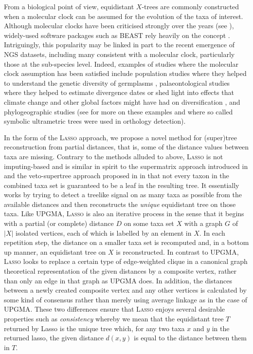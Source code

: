 From a biological point of view, equidistant $X$-trees are commonly
constructed when a molecular clock can be assumed for the evolution of the
taxa of interest.  Although molecular clocks have been criticised strongly
over the years (see \cite{ayala99molecular,schwartz06molecular}), widely-used
software packages such as BEAST rely heavily on the concept
\cite{bouckaert14beast}.  Intriguingly, this popularity may be linked in part
to the recent emergence of NGS datasets, including many consistent with a
molecular clock, particularly those at the sub-species level.  Indeed,
examples of studies where the molecular clock assumption has been satisfied
include population studies where they helped to understand the genetic
diversity of germplasms \cite{xiao10ssr}, palaeontological studies where they
helped to estimate divergence dates or shed light into effects that climate
change and other global factors might have had on diversification
\cite{weir08ice}, and phylogeographic studies \cite{confal1998mitochon} (see
\cite{weir08calibrating} for more on these examples and
\cite{hellmuth13orthology} where so called symbolic ultrametric trees were
used in orthology detection).

In the form of the \textsc{Lasso} approach, we propose a novel method for
(super)tree reconstruction from partial distances, that is, some of the
distance values between taxa are missing. Contrary to the methods alluded to
above, \textsc{Lasso} is not imputing-based and is similar in spirit to the
supermatrix approach introduced in \cite{misof13selecting} and the
veto-supertree approach proposed in \cite{scorn08physic} in that not every
taxon in the combined taxa set is guaranteed to be a leaf in the resulting
tree. It essentially works by trying to detect a treelike signal on as many
taxa as possible from the available distances and then reconstructs the
\textit{unique} equidistant tree on those taxa.  Like {\sc UPGMA},
\textsc{Lasso} is also an iterative process in the sense that it begins with a
partial (or complete) distance $D$ on some taxa set $X$ with a graph $G$ of
$|X|$ isolated vertices, each of which is labelled by an element in $X$. In
each repetition step, the distance on a smaller taxa set is recomputed and, in
a bottom up manner, an equidistant tree on $X$ is reconstructed. In contrast
to {\sc UPGMA}, \textsc{Lasso} looks to replace a certain type of
edge-weighted clique in a canonical graph theoretical representation of the
given distances by a composite vertex, rather than only an edge in that graph
as {\sc UPGMA} does. In addition, the distances between a newly created
composite vertex and any other vertices is calculated by some kind of
consensus rather than merely using average linkage as in the case of {\sc
  UPGMA}.  These two differences ensure that \textsc{Lasso} enjoys several
desirable properties such as {\em consistency} whereby we mean that the
equidistant tree $T$ returned by {\sc Lasso} is the unique tree which, for any
two taxa $x$ and $y$ in the returned lasso, the given distance $d(x,y)$ is
equal to the distance between them in $T$.

